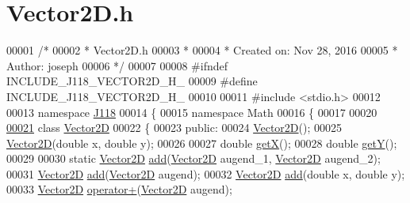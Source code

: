 \hypertarget{_vector2_d_8h_source}{}\section{Vector2\+D.\+h}
\label{_vector2_d_8h_source}

\begin{DoxyCode}
00001 \textcolor{comment}{/*}
00002 \textcolor{comment}{ * Vector2D.h}
00003 \textcolor{comment}{ *}
00004 \textcolor{comment}{ *  Created on: Nov 28, 2016}
00005 \textcolor{comment}{ *      Author: joseph}
00006 \textcolor{comment}{ */}
00007 
00008 \textcolor{preprocessor}{#ifndef INCLUDE\_J118\_VECTOR2D\_H\_}
00009 \textcolor{preprocessor}{#define INCLUDE\_J118\_VECTOR2D\_H\_}
00010 
00011 \textcolor{preprocessor}{#include <stdio.h>}
00012 
00013 \textcolor{keyword}{namespace }\hyperlink{namespace_j118}{J118}
00014 \{
00015 \textcolor{keyword}{namespace }Math
00016 \{
00017 
00020 
\hypertarget{_vector2_d_8h_source_l00021}{}\hyperlink{class_j118_1_1_math_1_1_vector2_d}{00021} \textcolor{keyword}{class }\hyperlink{class_j118_1_1_math_1_1_vector2_d}{Vector2D}
00022 \{
00023 \textcolor{keyword}{public}:
00024     \hyperlink{class_j118_1_1_math_1_1_vector2_d_afb5cccf703cc5fb06c48a7a947acb5f3}{Vector2D}();
00025     \hyperlink{class_j118_1_1_math_1_1_vector2_d_afb5cccf703cc5fb06c48a7a947acb5f3}{Vector2D}(\textcolor{keywordtype}{double} x, \textcolor{keywordtype}{double} y);
00026 
00027     \textcolor{keywordtype}{double} \hyperlink{class_j118_1_1_math_1_1_vector2_d_aaf6a3aac74ce510a72364b7a2c7b1e93}{getX}();
00028     \textcolor{keywordtype}{double} \hyperlink{class_j118_1_1_math_1_1_vector2_d_a20386c667a551511e94c955599f80fb4}{getY}();
00029 
00030     \textcolor{keyword}{static} \hyperlink{class_j118_1_1_math_1_1_vector2_d}{Vector2D} \hyperlink{class_j118_1_1_math_1_1_vector2_d_a6b13e1c9fc5c758c1e18a6b74d1182b2}{add}(\hyperlink{class_j118_1_1_math_1_1_vector2_d}{Vector2D} augend\_1, \hyperlink{class_j118_1_1_math_1_1_vector2_d}{Vector2D} augend\_2);
00031     \hyperlink{class_j118_1_1_math_1_1_vector2_d}{Vector2D} \hyperlink{class_j118_1_1_math_1_1_vector2_d_a6b13e1c9fc5c758c1e18a6b74d1182b2}{add}(\hyperlink{class_j118_1_1_math_1_1_vector2_d}{Vector2D} augend);
00032     \hyperlink{class_j118_1_1_math_1_1_vector2_d}{Vector2D} \hyperlink{class_j118_1_1_math_1_1_vector2_d_a6b13e1c9fc5c758c1e18a6b74d1182b2}{add}(\textcolor{keywordtype}{double} x, \textcolor{keywordtype}{double} y);
00033     \hyperlink{class_j118_1_1_math_1_1_vector2_d}{Vector2D} \hyperlink{class_j118_1_1_math_1_1_vector2_d_a13a3fb9bbc4a7d3fd00c5e0c4d8ebddb}{operator+}(\hyperlink{class_j118_1_1_math_1_1_vector2_d}{Vector2D} augend);

\end{DoxyCode}
